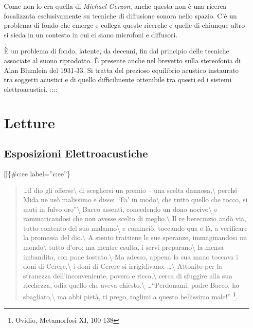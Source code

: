 \documentclass[a4paper,11pt]{article}
\begin{document}
Come non lo era quella di \emph{Michael Gerzon}, anche questa non è una
ricerca focalizzata esclusivamente su tecniche di diffusione sonora
nello spazio. C'è un problema di fondo che emerge e collega queste
ricerche e quelle di chiunque altro si sieda in un contesto in cui ci
siano microfoni e diffusori.

È un problema di fondo, latente, da decenni, fin dal principio delle
tecniche associate al suono riprodotto. È presente anche nel brevetto
sulla stereofonia di Alan Blumlein del 1931-33. Si tratta del prezioso
equilibrio acustico instaurato tra soggetti acustici e di quello
difficilmente ottenibile tra questi ed i sistemi elettroacustici.
::::

\section{Letture}\hypertarget{letture}{}\label{letture}

\subsection{Esposizioni Elettroacustiche}\hypertarget{esposizioni-elettroacustiche}{}\label{esposizioni-elettroacustiche}

{[}{]}\{\#c:ee label=''c:ee''\}

\begin{quote}
\ldots{}il dio gli offerse\textbackslash{}
di scegliersi un premio -- una scelta dannosa,\textbackslash{}
perché Mida ne usò malissimo e disse: ``Fa' in modo\textbackslash{}
che tutto quello che tocco, si muti in fulvo oro''\textbackslash{}
Bacco assentì, concedendo un dono nocivo\textbackslash{}
e rammaricandosi che non avesse scelto di meglio.\textbackslash{}
Il re berecinzio andò via, tutto contento del suo malanno\textbackslash{}
e cominciò, toccando qua e là, a verificare la promessa del dio.\textbackslash{}
A stento trattiene le sue speranze, immaginandosi un mondo\textbackslash{}
tutto d'oro: ma mentre esulta, i servi preparano\textbackslash{}
la mensa imbandita, con pane tostato.\textbackslash{}
Ma adesso, appena la sua mano toccava i doni di Cerere,\textbackslash{}
i doni di Cerere si irrigidivano; \ldots{}\textbackslash{}
Attonito per la stranezza dell'inconveniente, povero e ricco,\textbackslash{}
cerca di sfuggire alla sua ricchezza, odia quello che aveva chiesto.\textbackslash{}
\ldots{}``Perdonami, padre Bacco, ho sbagliato,\textbackslash{}
ma abbi pietà, ti prego, toglimi a questo bellissimo male!'' \footnote{Ovidio, Metamorfosi XI, 100-138}.
\end{quote}
\end{document}
